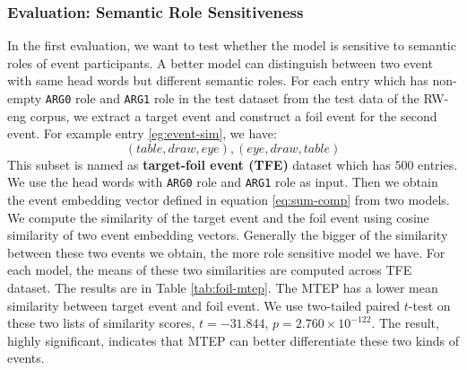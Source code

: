 \documentclass[a4paper]{article}
\begin{document}
\subsubsection{Evaluation: Semantic Role Sensitiveness} \label{sec:comp-srs}
In the first evaluation, we want to test whether the model is sensitive to semantic roles of event participants. A better model can distinguish between two event with same head words but different semantic roles. For each entry which has non-empty \texttt{ARG0} role and \texttt{ARG1} role in the test dataset from the test data of the RW-eng corpus, we extract a target event and construct a foil event for the second event. For example entry \eqref{eg:event-sim}, we have:
\begin{equation}
    (table, draw, eye), (eye, draw, table)
\end{equation}
This subset is named as \textbf{target-foil event (TFE)} dataset which has $500$ entries. We use the head words with \texttt{ARG0} role and \texttt{ARG1} role as input. Then we obtain the event embedding vector defined in equation  \eqref{eq:sum-comp} from two models. We compute the similarity of the target event and the foil event using cosine similarity of two event embedding vectors. Generally the bigger of the similarity between these two events we obtain, the more role sensitive model we have. For each model, the means of these two similarities are computed across TFE dataset. The results are in Table \ref{tab:foil-mtep}. The MTEP has a lower mean similarity between target event and foil event. We use two-tailed paired $t$-test on these two lists of similarity scores, $t=-31.844$, $p=2.760 \times 10^{-122}$. The result,  highly significant, indicates that MTEP can better differentiate these two kinds of events. 
\end{document}
